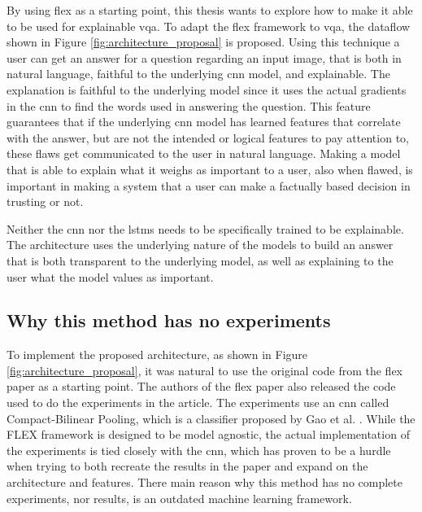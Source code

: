                 
        


        By using \gls{flex} as a starting point, this thesis wants to explore how to make it able to be used for explainable \gls{vqa}. To adapt the \gls{flex} framework to \gls{vqa}, the dataflow shown in Figure \ref{fig:architecture_proposal} is proposed. Using this technique a user can get an answer for a question regarding an input image, that is both in natural language, faithful to the underlying \gls{cnn} model, and explainable. The explanation is faithful to the underlying model since it uses the actual gradients in the \gls{cnn} to find the words used in answering the question. This feature guarantees that if the underlying \gls{cnn} model has learned features that correlate with the answer, but are not the intended or logical features to pay attention to, these flaws get communicated to the user in natural language. Making a model that is able to explain what it weighs as important to a user, also when flawed, is important in making a system that a user can make a factually based decision in trusting or not. 

        Neither the \gls{cnn} nor the \glspl{lstm} needs to be specifically trained to be explainable. The architecture uses the underlying nature of the models to build an answer that is both transparent to the underlying model, as well as explaining to the user what the model values as important. 



        \subsection{Why this method has no experiments}
        \label{subsec:no_flex}

            To implement the proposed architecture, as shown in Figure \ref{fig:architecture_proposal}, it was natural to use the original code from the \gls{flex} paper as a starting point.
            The authors of the \gls{flex} paper also released the code used to do the experiments in the article. The experiments use an \gls{cnn} called Compact-Bilinear Pooling, which is a classifier proposed by Gao et al. \cite{gaoCompactBilinearPooling2016}. While the FLEX framework is designed to be model agnostic, the actual implementation of the experiments is tied closely with the \gls{cnn}, which has proven to be a hurdle when trying to both recreate the results in the paper and expand on the architecture and features. There main reason why this method has no complete experiments, nor results, is an outdated machine learning framework.
    
